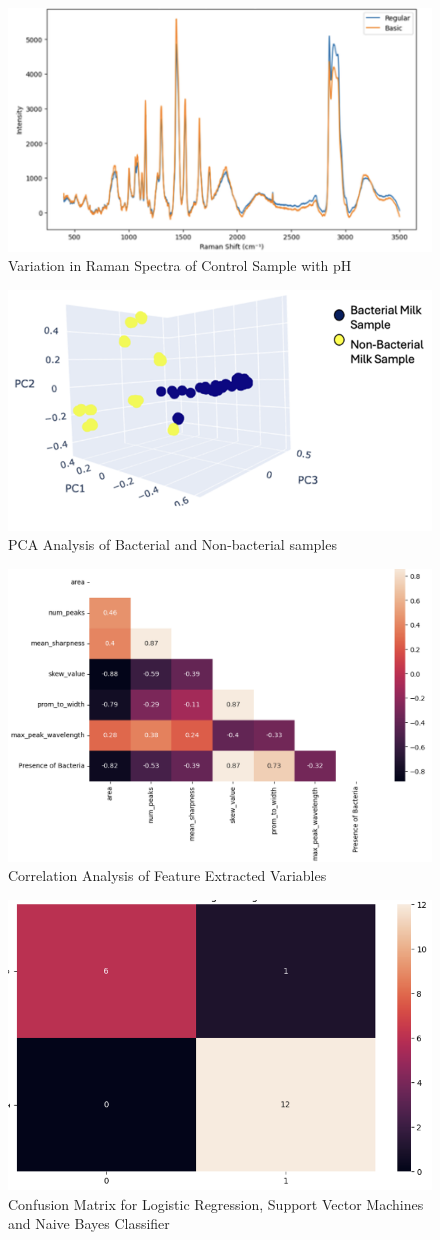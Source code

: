 \begin{figure}[h!]
    \centering
    \includegraphics[width=0.5\linewidth]{Figures/Screenshot 2025-07-16 at 2.27.24 PM.png}
    \caption{Variation in Raman Spectra of Control Sample with pH}
    \label{fig:confusion}
\end{figure}

\begin{figure}
    \centering
    \includegraphics[width=0.5\linewidth]{Figures/Screenshot 2025-07-16 at 2.27.37 PM.png}
    \caption{PCA Analysis of Bacterial and Non-bacterial samples}
    \label{fig:bac}
\end{figure}

\begin{figure}
    \centering
    \includegraphics[width=0.5\linewidth]{Figures/Screenshot 2025-07-16 at 2.27.59 PM.png}
    \caption{Correlation Analysis of Feature Extracted Variables}
    \label{fig:corr}
\end{figure}

\begin{figure}
    \centering
    \includegraphics[width=0.5\linewidth]{Figures/Screenshot 2025-07-16 at 2.28.32 PM.png}
    \caption{Confusion Matrix for Logistic Regression, Support Vector Machines and Naive Bayes Classifier}
    \label{fig:cm}
\end{figure}

